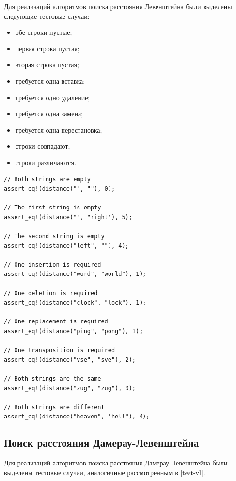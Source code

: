 \documentclass{report}
\begin{document}
Для реализаций алгоритмов поиска расстояния Левенштейна были
выделены следующие тестовые случаи:

\begin{itemize}
    \item обе строки пустые;
    \item первая строка пустая;
    \item вторая строка пустая;
    \item требуется одна вставка;
    \item требуется одно удаление;
    \item требуется одна замена;
    \item требуется одна перестановка;
    \item строки совпадают;
    \item строки различаются.
\end{itemize}

\begin{lstlisting}[caption=Тесты реализаций алгоритмов]
// Both strings are empty
assert_eq!(distance("", ""), 0);

// The first string is empty
assert_eq!(distance("", "right"), 5);

// The second string is empty
assert_eq!(distance("left", ""), 4);

// One insertion is required
assert_eq!(distance("word", "world"), 1);

// One deletion is required
assert_eq!(distance("clock", "lock"), 1);

// One replacement is required
assert_eq!(distance("ping", "pong"), 1);

// One transposition is required
assert_eq!(distance("vse", "sve"), 2);

// Both strings are the same
assert_eq!(distance("zug", "zug"), 0);

// Both strings are different
assert_eq!(distance("heaven", "hell"), 4);
\end{lstlisting}

\subsection{Поиск расстояния Дамерау-Левенштейна}

Для реализаций алгоритмов поиска расстояния Дамерау-Левенштейна
были выделены тестовые случаи, аналогичные рассмотренным в
\ref{test-vl}.
\end{document}
